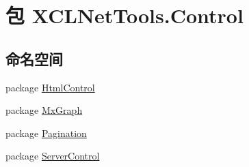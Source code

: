 \hypertarget{namespace_x_c_l_net_tools_1_1_control}{\section{包 X\-C\-L\-Net\-Tools.\-Control}
\label{namespace_x_c_l_net_tools_1_1_control}
}
\subsection*{命名空间}
\begin{DoxyCompactItemize}
\item 
package \hyperlink{namespace_x_c_l_net_tools_1_1_control_1_1_html_control}{Html\-Control}
\item 
package \hyperlink{namespace_x_c_l_net_tools_1_1_control_1_1_mx_graph}{Mx\-Graph}
\item 
package \hyperlink{namespace_x_c_l_net_tools_1_1_control_1_1_pagination}{Pagination}
\item 
package \hyperlink{namespace_x_c_l_net_tools_1_1_control_1_1_server_control}{Server\-Control}
\end{DoxyCompactItemize}
